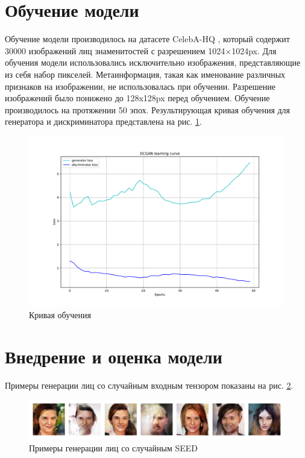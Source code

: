 \documentclass[60x84/16,8pt]{ittmm}
\begin{document}
\section{Обучение модели}
\label{sec:base-section}

Обучение модели производилось на датасете CelebA-HQ \cite{celeba-hq},
который содержит 30000 изображений лиц знаменитостей с разрешением 1024×1024px.
Для обучения модели использовались исключительно изображения,
представляющие из себя набор пикселей. Метаинформация, такая как именование
различных признаков на изображении, не использовалась при обучении.
Разрешение изображений было понижено до 128x128px перед обучением.
Обучение производилось на протяжении 50 эпох. Результирующая кривая
обучения для генератора и дискриминатора представлена на рис. \ref{fig:learning-curve}.

\begin{figure}
  \centering
  \includegraphics[width=\linewidth]{learning_curve}
  \caption{Кривая обучения}
  \label{fig:learning-curve}
\end{figure}

\section{Внедрение и оценка модели}
\label{sec:base-section}

Примеры генерации лиц со случайным входным тензором показаны на рис. \ref{fig:result-random-seed}.

\begin{figure}
  \centering
  \includegraphics[width=\linewidth]{output}
  \caption{Примеры генерации лиц со случайным SEED}
  \label{fig:result-random-seed}
\end{figure}
\end{document}
